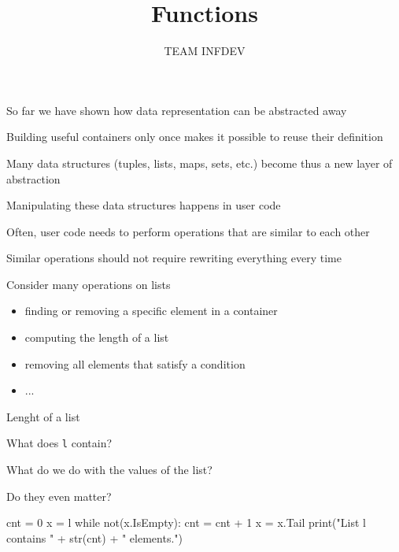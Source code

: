 \documentclass{beamer}
\title{Functions}
\author{TEAM INFDEV}
\institute{Hogeschool Rotterdam \\ 
Rotterdam, Netherlands}
\date{}
\begin{document}
\maketitle

\begin{slide}{
\item So far we have shown how data representation can be abstracted away
\item Building useful containers only once makes it possible to reuse their definition
\item Many data structures (tuples, lists, maps, sets, etc.) become thus a new layer of abstraction
}\end{slide}

\begin{slide}{
\item Manipulating these data structures happens in user code
\item Often, user code needs to perform operations that are similar to each other
\item Similar operations should not require rewriting everything every time
}\end{slide}

\begin{slide}{
\item Consider many operations on lists
\begin{itemize}
\item finding or removing a specific element in a container
\item computing the length of a list
\item removing all elements that satisfy a condition
\item ...
\end{itemize}
}\end{slide}

\begin{frame}[fragile]{Lenght of a list}
\begin{codewithblock}{\pause \item What does \texttt{l} contain? \item What do we do with the values of the list? \item Do they even matter?}
cnt = 0
x = l
while not(x.IsEmpty):
  cnt = cnt + 1
  x = x.Tail
print("List l contains " + str(cnt) + " elements.")
\end{codewithblock}
\end{frame}
\end{document}
